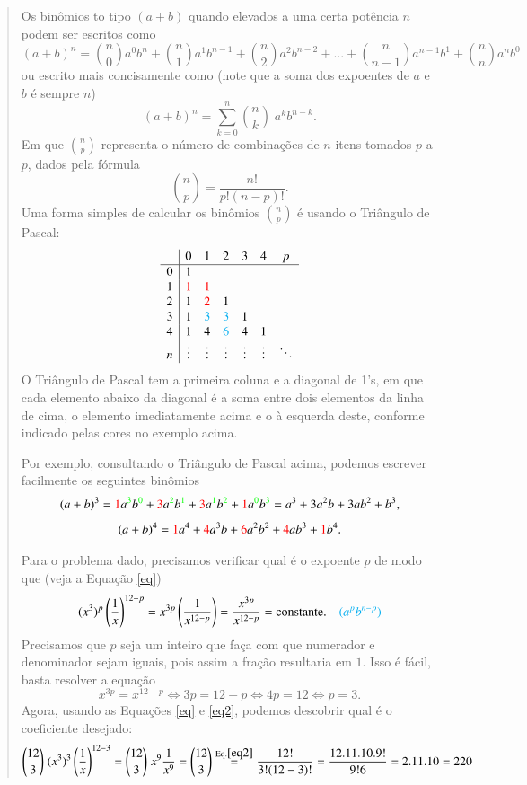 \documentclass[12pt,a4paper]{article}
\newenvironment{ans}{\color{blue}\begin{quote}}{\end{quote}}
\begin{document}
\begin{enumerate}
	\begin{ans}
	Os binômios to tipo $(a+b)$ quando elevados a uma certa potência $n$ podem ser escritos como
	\[
	(a+b)^n = \binom{n}{0}a^0b^n+\binom{n}{1}a^1b^{n-1}+\binom{n}{2}a^2b^{n-2}+...+\binom{n}{n-1}a^{n-1}b^1+\binom{n}{n}a^nb^0
	\]
	ou escrito mais concisamente como (note que a soma dos expoentes de $a$ e $b$ é sempre $n$)
	\[\tag{1}\label{eq}
	(a+b)^n = \sum_{k=0}^{n}\binom{n}{k}\;a^kb^{n-k}.
	\]
	Em que $\binom{n}{p}$ representa o número de combinações de $n$ itens tomados $p$ a $p$, dados pela fórmula
	\[\tag{2}\label{eq2}
	\binom{n}{p}=\frac{n!}{p!(n-p)!}.
	\]
	Uma forma simples de calcular os binômios $\binom{n}{p}$ é usando o Triângulo de Pascal:
	\[
	\def\r{\color{red}}
	\def\s{\color{cyan}}
	\begin{array}{c|cccccc}
	& 0 & 1 & 2 & 3 & 4 & p\\
	\hline
	0 & 1\\
	1 & \r 1 &\r 1\\
	2 & 1 &\r 2 & 1\\
	3 & 1 & \s 3 & \s 3 & 1\\
	4 & 1 & 4 & \s 6 & 4 & 1\\
	n & \vdots & \vdots & \vdots & \vdots & \vdots & \ddots
	\end{array}
	\]
	O Triângulo de Pascal tem a primeira coluna e a diagonal de 1's,
	em que cada elemento abaixo da diagonal é a soma entre dois elementos da linha de cima, o elemento imediatamente acima e o à esquerda deste, conforme indicado pelas cores no exemplo acima.
	
	Por exemplo, consultando o Triângulo de Pascal acima, podemos escrever facilmente os seguintes binômios
	\[
	\def\r{\color{red}}
	\def\s{\color{green}}
	(a+b)^3 = {\r 1}a^{\s 3}b^{\s 0}+{\r 3}a^{\s 2}b^{\s 1}+{\r 3}a^{\s 1}b^{\s 2}+{\r 1}a^{\s 0}b^{\s 3}=a^3+3a^2b+3ab^2+b^3,
	\]
	\[
	\def\r{\color{red}}
	(a+b)^4 = {\r 1}a^4+{\r 4}a^3b+{\r 6}a^2b^2+{\r 4}ab^3+{\r 1}b^4
	.\]
	
	Para o problema dado, precisamos verificar qual é o expoente $p$ de modo que (veja a Equação \eqref{eq})
	\[
	(x^3)^p\left(\frac{1}{x}\right)^{12-p}=x^{3p}\left(\frac{1}{x^{12-p}}\right)=\frac{x^{3p}}{x^{12-p}}=\text{constante}.\quad \color{cyan}(a^pb^{n-p})
	\]
	Precisamos que $p$ seja um inteiro que faça com que numerador e denominador sejam iguais, pois assim a fração resultaria em $1$. Isso é fácil, basta resolver a equação 
	\[
	x^{3p}=x^{12-p} \iff
	3p=12-p\iff 4p=12\iff p=3.
	\]
	Agora, usando as Equações \eqref{eq} e \eqref{eq2}, podemos descobrir qual é o coeficiente desejado:
\[
\binom{12}{3}\;(x^3)^3\left(\frac{1}{x}\right)^{12-3}=\binom{12}{3}\;x^9\frac{1}{x^9}=\binom{12}{3} \stackrel{\text{Eq.}\eqref{eq2}}{=} \frac{12!}{3!(12-3)!}=\frac{12.11.10.9!}{9!6}=2.11.10=220
\]	


\end{ans}
\end{enumerate}
\end{document}
